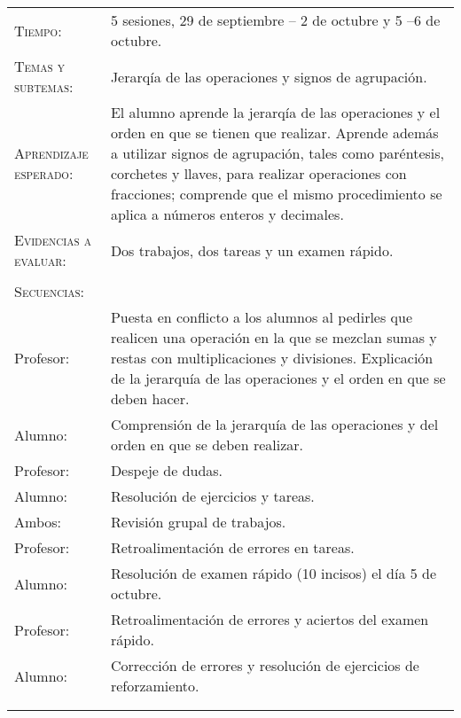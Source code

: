 \documentclass[letterpaper,10pt]{article}
\begin{document}
\begin{tabular}[t]{R{0.25\textwidth}p{0.71\textwidth}}
    \textsc{Tiempo:}                   & 5 sesiones, 29 de septiembre -- 2 de octubre y 5 --6 de octubre. \\
    \textsc{Temas y subtemas:}         & Jerarq\'ia de las operaciones y signos de agrupaci\'on. \\
    \textsc{Aprendizaje esperado: }    & El alumno aprende la jerarq\'ia de las
    operaciones y el orden en que se tienen que realizar. Aprende adem\'as a
    utilizar signos de agrupaci\'on, tales como par\'entesis, corchetes y
    llaves, para realizar operaciones con fracciones; comprende que el mismo
    procedimiento se aplica a n\'umeros enteros y decimales. \\
    \textsc{Evidencias a evaluar:}      & Dos trabajos, dos tareas y un examen r\'apido. \\\\
    \textsc{\large Secuencias:} \\
    Profesor: & Puesta en conflicto a los alumnos al pedirles que realicen una
    operaci\'on en la que se mezclan sumas y restas con multiplicaciones y
    divisiones. Explicaci\'on de la jerarqu\'ia de las operaciones y el orden en
    que se deben hacer. \\ Alumno: & Comprensi\'on de la jerarqu\'ia de las
    operaciones y del orden en que se deben realizar. \\ Profesor: & Despeje de
    dudas. \\ Alumno: & Resoluci\'on de ejercicios y tareas. \\ Ambos: &
    Revisi\'on grupal de trabajos. \\ Profesor: & Retroalimentaci\'on de errores
    en tareas. \\ Alumno: & Resoluci\'on de examen r\'apido (10 incisos) el
    d\'ia 5 de octubre. \\ Profesor: & Retroalimentaci\'on de errores y aciertos
    del examen r\'apido.\\ Alumno: & Correcci\'on de errores y resoluci\'on de
    ejercicios de reforzamiento. \\

\\ \hline \\


\end{tabular}
\end{document}
